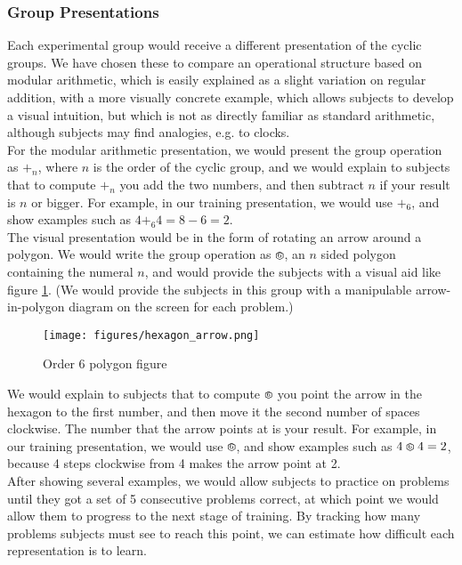\documentclass[11pt]{article}
\def\hex{\mathrel{%
    \mathchoice{\HEX}{\HEX}{\scriptsize\HEX}{\tiny\HEX}%
}}
\def\HEX{{%
    \setbox0\hbox{\varhexagon}%
    \rlap{\hbox to \wd0{\hss\raisebox{1 pt}{\scaleobj{0.6}{6}}\hss}}\box0
}}
\begin{document}
\subsubsection{Group Presentations}
Each experimental group would receive a different presentation of the cyclic groups. We have chosen these to compare an operational structure based on modular arithmetic, which is easily explained as a slight variation on regular addition, with a more visually concrete example, which allows subjects to develop a visual intuition, but which is not as directly familiar as standard arithmetic, although subjects may find analogies, e.g. to clocks. \\[11pt] 
For the modular arithmetic presentation, we would present the group operation as $+_n$, where $n$ is the order of the cyclic group, and we would explain to subjects that to compute $+_n$ you add the two numbers, and then subtract $n$ if your result is $n$ or bigger. For example, in our training presentation, we would use $+_6$, and show examples such as $4 +_6 4 = 8 - 6 = 2$. \\[11pt]
The visual presentation would be in the form of rotating an arrow around a polygon. We would write the group operation as $\hex$, an $n$ sided polygon containing the numeral $n$, and would provide the subjects with a visual aid like figure \ref{hexagonex}. (We would provide the subjects in this group with a manipulable arrow-in-polygon diagram on the screen for each problem.)
\begin{figure}[H] \centering \texttt{[image: figures/hexagon\_arrow.png]} \caption{Order 6 polygon figure} \label{hexagonex} \end{figure} \noindent
We would explain to subjects that to compute $\hex$ you point the arrow in the hexagon to the first number, and then move it the second number of spaces clockwise. The number that the arrow points at is your result. For example, in our training presentation, we would use $\hex$, and show examples such as $4 \hex 4 = 2$, because 4 steps clockwise from 4 makes the arrow point at 2. \\[11pt]
After showing several examples, we would allow subjects to practice on problems until they got a set of 5 consecutive problems correct, at which point we would allow them to progress to the next stage of training. By tracking how many problems subjects must see to reach this point, we can estimate how difficult each representation is to learn.
\end{document}
